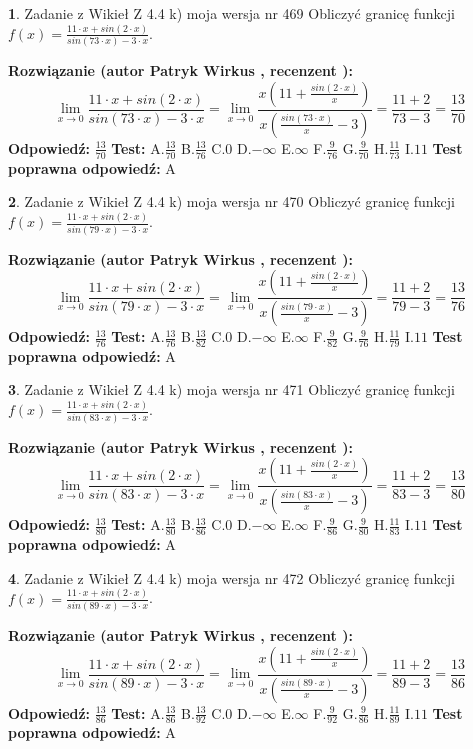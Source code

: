 \documentclass[12pt, a4paper]{article}
\theoremstyle{definition} %
\newtheorem{zad}{}
\newcommand{\zadStart}[1]{\begin{zad}#1\newline}
\newcommand{\zadStop}{\end{zad}}
\newcommand{\rozwStart}[2]{\noindent \textbf{Rozwiązanie (autor #1 , recenzent #2): }\newline}
\newcommand{\rozwStop}{\newline}
\newcommand{\odpStart}{\noindent \textbf{Odpowiedź:}\newline}
\newcommand{\odpStop}{\newline}
\newcommand{\testStart}{\noindent \textbf{Test:}\newline}
\newcommand{\testStop}{\newline}
\newcommand{\kluczStart}{\noindent \textbf{Test poprawna odpowiedź:}\newline}
\newcommand{\kluczStop}{\newline}
\begin{document}
\zadStart{Zadanie z Wikieł Z 4.4 k) moja wersja nr 469}
Obliczyć granicę funkcji $f(x)=\frac{11\cdot x +sin(2\cdot x)}{sin(73\cdot x) -3\cdot x}$.
\zadStop
\rozwStart{Patryk Wirkus}{}
$$\lim\limits_{x\to 0}\frac{11\cdot x +sin(2\cdot x)}{sin(73\cdot x) -3\cdot x}
=\lim\limits_{x\to 0}\frac{x(11+\frac{sin(2\cdot x)}{x})}{x(\frac{sin(73\cdot x)}{x}-3)}
=\frac{11+2}{73-3} = \frac{13}{70}$$
\rozwStop
\odpStart
$\frac{13}{70}$
\odpStop
\testStart
A.$\frac{13}{70}$
B.$\frac{13}{76}$
C.$0$
D.$-\infty$
E.$\infty$
F.$\frac{9}{76}$
G.$\frac{9}{70}$
H.$\frac{11}{73}$
I.$11$
\testStop
\kluczStart
A
\kluczStop



\zadStart{Zadanie z Wikieł Z 4.4 k) moja wersja nr 470}
Obliczyć granicę funkcji $f(x)=\frac{11\cdot x +sin(2\cdot x)}{sin(79\cdot x) -3\cdot x}$.
\zadStop
\rozwStart{Patryk Wirkus}{}
$$\lim\limits_{x\to 0}\frac{11\cdot x +sin(2\cdot x)}{sin(79\cdot x) -3\cdot x}
=\lim\limits_{x\to 0}\frac{x(11+\frac{sin(2\cdot x)}{x})}{x(\frac{sin(79\cdot x)}{x}-3)}
=\frac{11+2}{79-3} = \frac{13}{76}$$
\rozwStop
\odpStart
$\frac{13}{76}$
\odpStop
\testStart
A.$\frac{13}{76}$
B.$\frac{13}{82}$
C.$0$
D.$-\infty$
E.$\infty$
F.$\frac{9}{82}$
G.$\frac{9}{76}$
H.$\frac{11}{79}$
I.$11$
\testStop
\kluczStart
A
\kluczStop



\zadStart{Zadanie z Wikieł Z 4.4 k) moja wersja nr 471}
Obliczyć granicę funkcji $f(x)=\frac{11\cdot x +sin(2\cdot x)}{sin(83\cdot x) -3\cdot x}$.
\zadStop
\rozwStart{Patryk Wirkus}{}
$$\lim\limits_{x\to 0}\frac{11\cdot x +sin(2\cdot x)}{sin(83\cdot x) -3\cdot x}
=\lim\limits_{x\to 0}\frac{x(11+\frac{sin(2\cdot x)}{x})}{x(\frac{sin(83\cdot x)}{x}-3)}
=\frac{11+2}{83-3} = \frac{13}{80}$$
\rozwStop
\odpStart
$\frac{13}{80}$
\odpStop
\testStart
A.$\frac{13}{80}$
B.$\frac{13}{86}$
C.$0$
D.$-\infty$
E.$\infty$
F.$\frac{9}{86}$
G.$\frac{9}{80}$
H.$\frac{11}{83}$
I.$11$
\testStop
\kluczStart
A
\kluczStop



\zadStart{Zadanie z Wikieł Z 4.4 k) moja wersja nr 472}
Obliczyć granicę funkcji $f(x)=\frac{11\cdot x +sin(2\cdot x)}{sin(89\cdot x) -3\cdot x}$.
\zadStop
\rozwStart{Patryk Wirkus}{}
$$\lim\limits_{x\to 0}\frac{11\cdot x +sin(2\cdot x)}{sin(89\cdot x) -3\cdot x}
=\lim\limits_{x\to 0}\frac{x(11+\frac{sin(2\cdot x)}{x})}{x(\frac{sin(89\cdot x)}{x}-3)}
=\frac{11+2}{89-3} = \frac{13}{86}$$
\rozwStop
\odpStart
$\frac{13}{86}$
\odpStop
\testStart
A.$\frac{13}{86}$
B.$\frac{13}{92}$
C.$0$
D.$-\infty$
E.$\infty$
F.$\frac{9}{92}$
G.$\frac{9}{86}$
H.$\frac{11}{89}$
I.$11$
\testStop
\kluczStart
A
\kluczStop
\end{document}
